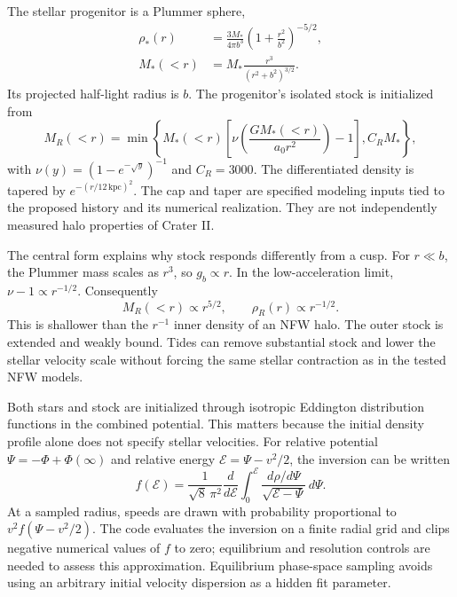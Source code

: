 The stellar progenitor is a Plummer sphere,
\begin{align}
\rho_*(r)&=\frac{3M_*}{4\pi b^3}
\left(1+\frac{r^2}{b^2}\right)^{-5/2},\\
M_*(<r)&=M_*\frac{r^3}{(r^2+b^2)^{3/2}}.
\end{align}
Its projected half-light radius is $b$. The progenitor's isolated stock is
initialized from
\begin{equation}
M_R(<r)=\min\left\{M_*(<r)
\left[\nu\!\left(\frac{GM_*(<r)}{a_0r^2}\right)-1\right],
C_RM_*\right\},
\label{eq:dwarfstock}
\end{equation}
with $\nu(y)=(1-e^{-\sqrt y})^{-1}$ and $C_R=3000$.
The differentiated density is tapered by $e^{-(r/12\,\mathrm{kpc})^2}$.
The cap and taper are specified modeling inputs tied to the proposed
history and its numerical realization. They are not independently
measured halo properties of Crater II.

The central form explains why stock responds differently from a cusp.
For $r\ll b$, the Plummer mass scales as $r^3$, so $g_b\propto r$.
In the low-acceleration limit, $\nu-1\propto r^{-1/2}$. Consequently
\begin{equation}
M_R(<r)\propto r^{5/2},\qquad \rho_R(r)\propto r^{-1/2}.
\end{equation}
This is shallower than the $r^{-1}$ inner density of an NFW halo. The
outer stock is extended and weakly bound. Tides can remove substantial
stock and lower the stellar velocity scale without forcing the same
stellar contraction as in the tested NFW models.

Both stars and stock are initialized through isotropic Eddington
distribution functions in the combined potential. This matters because
the initial density profile alone does not specify stellar velocities.
For relative potential $\Psi=-\Phi+\Phi(\infty)$ and relative energy
$\mathcal E=\Psi-v^2/2$, the inversion can be written
\begin{equation}
f(\mathcal E)=\frac{1}{\sqrt8\,\pi^2}\frac{d}{d\mathcal E}
\int_0^{\mathcal E}\frac{d\rho/d\Psi}{\sqrt{\mathcal E-\Psi}}\,d\Psi.
\end{equation}
At a sampled radius, speeds are drawn with probability proportional to
$v^2f(\Psi-v^2/2)$. The code evaluates the inversion on a finite radial
grid and clips negative numerical values of $f$ to zero; equilibrium and
resolution controls are needed to assess this approximation.
Equilibrium phase-space sampling avoids using an arbitrary initial
velocity dispersion as a hidden fit parameter. 

